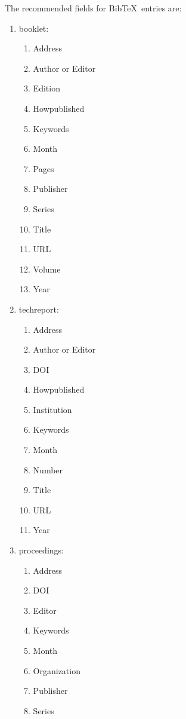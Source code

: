 \documentclass[letter,12pt]{article}
\begin{document}
The recommended fields for {\sc Bib}\TeX\ entries are: \vspace{-0.3cm}
\begin{enumerate} \itemsep -4pt
\item booklet: \vspace{-0.3cm}
	\begin{enumerate} \itemsep -2pt
	\item Address
	\item Author or Editor
	\item Edition
	\item Howpublished
	\item Keywords
	\item Month
	\item Pages
	\item Publisher
	\item Series
	\item Title
	\item URL
	\item Volume
	\item Year
	\end{enumerate}
\item techreport: \vspace{-0.3cm}
	\begin{enumerate} \itemsep -2pt
	\item Address
	\item Author or Editor
	\item DOI
	\item Howpublished
	\item Institution
	\item Keywords
	\item Month
	\item Number
	\item Title
	\item URL
	\item Year
	\end{enumerate}
\item proceedings: \vspace{-0.3cm}
	\begin{enumerate} \itemsep -2pt
	\item Address
	\item DOI
	\item Editor
	\item Keywords
	\item Month
	\item Organization
	\item Publisher
	\item Series

\end{enumerate}
\end{enumerate}
\end{document}
